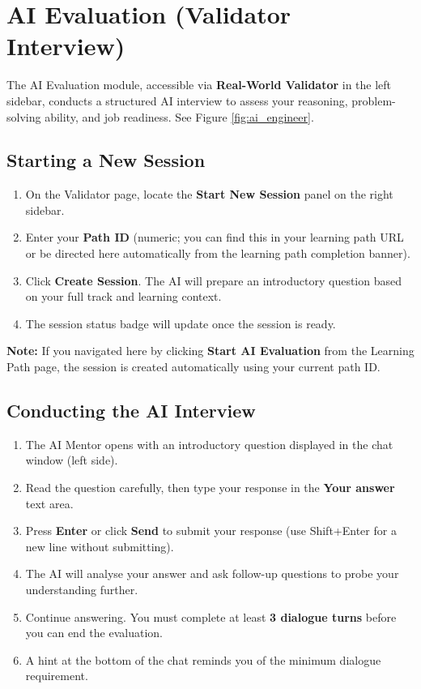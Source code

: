 \documentclass{FastFyp}
\begin{document}
\section{AI Evaluation (Validator Interview)}

The AI Evaluation module, accessible via \textbf{Real-World Validator} in the left sidebar, conducts a structured AI interview to assess your reasoning, problem-solving ability, and job readiness. See Figure \ref{fig:ai_engineer}.

\subsection{Starting a New Session}
\begin{enumerate}
    \item On the Validator page, locate the \textbf{Start New Session} panel on the right sidebar.
    \item Enter your \textbf{Path ID} (numeric; you can find this in your learning path URL or be directed here automatically from the learning path completion banner).
    \item Click \textbf{Create Session}. The AI will prepare an introductory question based on your full track and learning context.
    \item The session status badge will update once the session is ready.
\end{enumerate}

\noindent\textbf{Note:} If you navigated here by clicking \textbf{Start AI Evaluation} from the Learning Path page, the session is created automatically using your current path ID.

\subsection{Conducting the AI Interview}
\begin{enumerate}
    \item The AI Mentor opens with an introductory question displayed in the chat window (left side).
    \item Read the question carefully, then type your response in the \textbf{Your answer} text area.
    \item Press \textbf{Enter} or click \textbf{Send} to submit your response (use Shift+Enter for a new line without submitting).
    \item The AI will analyse your answer and ask follow-up questions to probe your understanding further.
    \item Continue answering. You must complete at least \textbf{3 dialogue turns} before you can end the evaluation.
    \item A hint at the bottom of the chat reminds you of the minimum dialogue requirement.
\end{enumerate}
\end{document}
